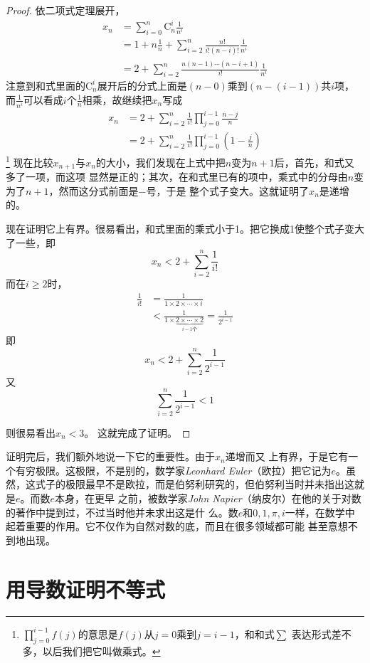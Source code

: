 \begin{proof}
依二项式定理展开，
\begin{align}
x_n 
&= \sum_{i = 0}^{n}{\text{C}_{n}^{i}\frac{1}{n^i}} \nonumber \\
&= 1 + n\frac{1}{n} + 
\sum_{i=2}^n{\frac{n!}{i!(n-i)!}\frac{1}{n^i}} \nonumber \\
&= 2 + \sum_{i=2}^n{\frac{n(n-1)\cdots(n-i+1)}{i!}\frac{1}{n^i}}
\end{align}
注意到和式里面的$\text{C}_{n}^{i}$展开后的分式上面是$(n-0)$乘到$(n-(i-1))$共$i$项，
而$\frac{1}{n^i}$可以看成$i$个$\frac{1}{n}$相乘，故继续把$x_n$写成
\begin{align}
x_n 
&= 2 + \sum_{i=2}^n{\frac{1}{i!}\prod_{j=0}^{i-1}{\frac{n-j}{n}}} \nonumber \\
&= 2 + \sum_{i=2}^n{\frac{1}{i!}\prod_{j=0}^{i-1}{(1-\frac{j}{n})}}
\end{align}
\footnote{$\prod_{j=0}^{i-1}{f(j)}$的意思是$f(j)$从$j=0$乘到$j=i-1$，和和式$\sum $
表达形式差不多，以后我们把它叫做乘式。}
现在比较$x_{n+1}$与$x_n$的大小，我们发现在上式中把$n$变为$n+1$后，首先，和式又	多了一项，而这项
显然是正的；其次，在和式里已有的项中，乘式中的分母由$n$变为了$n+1$，然而这分式前面是$-$号，于是
整个式子变大。这就证明了$x_n$是递增的。

现在证明它上有界。很易看出，和式里面的乘式小于1。把它换成1使整个式子变大了一些，即
\[
x_n < 2 + \sum_{i=2}^n{\frac{1}{i!}}
\]
而在$i \geq 2$时，
\begin{align*}
\frac{1}{i!} 
&= \frac{1}{1 \times 2 \times \cdots \times i} \\
&< \frac{1}{1 \times \underbrace{2 \times \cdots \times 2}_{i-1\text{个}}} 
= \frac{1}{2^{i-1}}
\end{align*}
即
\[
x_n < 2 + \sum_{i=2}^n{\frac{1}{2^{i-1}}}
\]
又
\[
\sum_{i=2}^n{\frac{1}{2^{i-1}}} < 1
\]

则很易看出$x_n < 3$。
这就完成了证明。
\end{proof}

证明完后，我们额外地说一下它的重要性。由于$x_n$递增而又
上有界，于是它有一个有穷极限。这极限，不是别的，数学家\emph{Leonhard Euler}（欧拉）把它记为$e$。虽
然，这式子的极限最早不是欧拉，而是伯努利研究的，但伯努利当时并未指出这就是$e$。而数$e$本身，在更早
之前，被数学家\emph{John Napier}（纳皮尔）在他的关于对数的著作中提到过，不过当时他并未求出这是什
么。数$e$和$0,1,\pi,i$一样，在数学中起着重要的作用。它不仅作为自然对数的底，而且在很多领域都可能
甚至意想不到地出现。

\section{用导数证明不等式}
